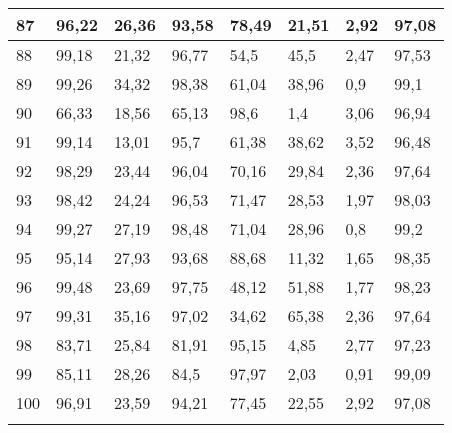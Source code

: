 \begin{longtable}[c]{|l|l|l|l|l|l|l|l|}
87              & 96,22        & 26,36        & 93,58       & 78,49         & 21,51         & 2,92          & 97,08         \\ \hline
88              & 99,18        & 21,32        & 96,77       & 54,5          & 45,5          & 2,47          & 97,53         \\ \hline
89              & 99,26        & 34,32        & 98,38       & 61,04         & 38,96         & 0,9           & 99,1          \\ \hline
90              & 66,33        & 18,56        & 65,13       & 98,6          & 1,4           & 3,06          & 96,94         \\ \hline
91              & 99,14        & 13,01        & 95,7        & 61,38         & 38,62         & 3,52          & 96,48         \\ \hline
92              & 98,29        & 23,44        & 96,04       & 70,16         & 29,84         & 2,36          & 97,64         \\ \hline
93              & 98,42        & 24,24        & 96,53       & 71,47         & 28,53         & 1,97          & 98,03         \\ \hline
94              & 99,27        & 27,19        & 98,48       & 71,04         & 28,96         & 0,8           & 99,2          \\ \hline
95              & 95,14        & 27,93        & 93,68       & 88,68         & 11,32         & 1,65          & 98,35         \\ \hline
96              & 99,48        & 23,69        & 97,75       & 48,12         & 51,88         & 1,77          & 98,23         \\ \hline
97              & 99,31        & 35,16        & 97,02       & 34,62         & 65,38         & 2,36          & 97,64         \\ \hline
98              & 83,71        & 25,84        & 81,91       & 95,15         & 4,85          & 2,77          & 97,23         \\ \hline
99              & 85,11        & 28,26        & 84,5        & 97,97         & 2,03          & 0,91          & 99,09         \\ \hline
100             & 96,91        & 23,59        & 94,21       & 77,45         & 22,55         & 2,92          & 97,08         \\ \hline
\label{anx:medianalab}
\end{longtable}
